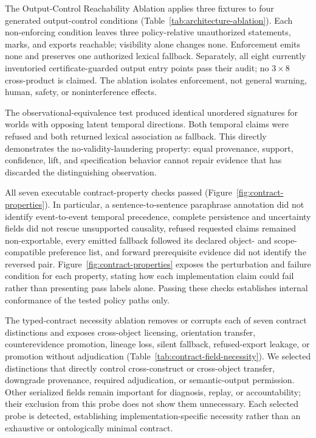 \documentclass[manuscript,screen,review]{acmart}
\begin{document}


The Output-Control Reachability Ablation applies three fixtures to four generated output-control conditions (Table~\ref{tab:architecture-ablation}). Each non-enforcing condition leaves three policy-relative unauthorized statements, marks, and exports reachable; visibility alone changes none. Enforcement emits none and preserves one authorized lexical fallback. Separately, all eight currently inventoried certificate-guarded output entry points pass their audit; no $3\times8$ cross-product is claimed. The ablation isolates enforcement, not general warning, human, safety, or noninterference effects.



The observational-equivalence test produced identical unordered signatures for worlds with opposing latent temporal directions. Both temporal claims were refused and both returned lexical association as fallback. This directly demonstrates the no-validity-laundering property: equal provenance, support, confidence, lift, and specification behavior cannot repair evidence that has discarded the distinguishing observation.

All seven executable contract-property checks passed (Figure~\ref{fig:contract-properties}). In particular, a sentence-to-sentence paraphrase annotation did not identify event-to-event temporal precedence, complete persistence and uncertainty fields did not rescue unsupported causality, refused requested claims remained non-exportable, every emitted fallback followed its declared object- and scope-compatible preference list, and forward prerequisite evidence did not identify the reversed pair. Figure~\ref{fig:contract-properties} exposes the perturbation and failure condition for each property, stating how each implementation claim could fail rather than presenting pass labels alone. Passing these checks establishes internal conformance of the tested policy paths only.

The typed-contract necessity ablation removes or corrupts each of seven contract distinctions and exposes cross-object licensing, orientation transfer, counterevidence promotion, lineage loss, silent fallback, refused-export leakage, or promotion without adjudication (Table~\ref{tab:contract-field-necessity}). We selected distinctions that directly control cross-construct or cross-object transfer, downgrade provenance, required adjudication, or semantic-output permission. Other serialized fields remain important for diagnosis, replay, or accountability; their exclusion from this probe does not show them unnecessary. Each selected probe is detected, establishing implementation-specific necessity rather than an exhaustive or ontologically minimal contract.
\end{document}

